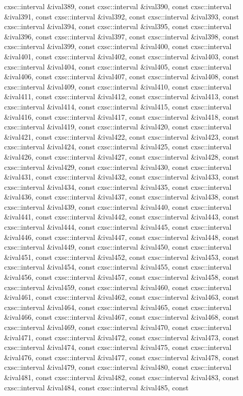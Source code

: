 \begin{DoxyCompactItemize}
cxsc\-::interval \&ival389, const cxsc\-::interval \&ival390, const cxsc\-::interval \&ival391, const cxsc\-::interval \&ival392, const cxsc\-::interval \&ival393, const cxsc\-::interval \&ival394, const cxsc\-::interval \&ival395, const cxsc\-::interval \&ival396, const cxsc\-::interval \&ival397, const cxsc\-::interval \&ival398, const cxsc\-::interval \&ival399, const cxsc\-::interval \&ival400, const cxsc\-::interval \&ival401, const cxsc\-::interval \&ival402, const cxsc\-::interval \&ival403, const cxsc\-::interval \&ival404, const cxsc\-::interval \&ival405, const cxsc\-::interval \&ival406, const cxsc\-::interval \&ival407, const cxsc\-::interval \&ival408, const cxsc\-::interval \&ival409, const cxsc\-::interval \&ival410, const cxsc\-::interval \&ival411, const cxsc\-::interval \&ival412, const cxsc\-::interval \&ival413, const cxsc\-::interval \&ival414, const cxsc\-::interval \&ival415, const cxsc\-::interval \&ival416, const cxsc\-::interval \&ival417, const cxsc\-::interval \&ival418, const cxsc\-::interval \&ival419, const cxsc\-::interval \&ival420, const cxsc\-::interval \&ival421, const cxsc\-::interval \&ival422, const cxsc\-::interval \&ival423, const cxsc\-::interval \&ival424, const cxsc\-::interval \&ival425, const cxsc\-::interval \&ival426, const cxsc\-::interval \&ival427, const cxsc\-::interval \&ival428, const cxsc\-::interval \&ival429, const cxsc\-::interval \&ival430, const cxsc\-::interval \&ival431, const cxsc\-::interval \&ival432, const cxsc\-::interval \&ival433, const cxsc\-::interval \&ival434, const cxsc\-::interval \&ival435, const cxsc\-::interval \&ival436, const cxsc\-::interval \&ival437, const cxsc\-::interval \&ival438, const cxsc\-::interval \&ival439, const cxsc\-::interval \&ival440, const cxsc\-::interval \&ival441, const cxsc\-::interval \&ival442, const cxsc\-::interval \&ival443, const cxsc\-::interval \&ival444, const cxsc\-::interval \&ival445, const cxsc\-::interval \&ival446, const cxsc\-::interval \&ival447, const cxsc\-::interval \&ival448, const cxsc\-::interval \&ival449, const cxsc\-::interval \&ival450, const cxsc\-::interval \&ival451, const cxsc\-::interval \&ival452, const cxsc\-::interval \&ival453, const cxsc\-::interval \&ival454, const cxsc\-::interval \&ival455, const cxsc\-::interval \&ival456, const cxsc\-::interval \&ival457, const cxsc\-::interval \&ival458, const cxsc\-::interval \&ival459, const cxsc\-::interval \&ival460, const cxsc\-::interval \&ival461, const cxsc\-::interval \&ival462, const cxsc\-::interval \&ival463, const cxsc\-::interval \&ival464, const cxsc\-::interval \&ival465, const cxsc\-::interval \&ival466, const cxsc\-::interval \&ival467, const cxsc\-::interval \&ival468, const cxsc\-::interval \&ival469, const cxsc\-::interval \&ival470, const cxsc\-::interval \&ival471, const cxsc\-::interval \&ival472, const cxsc\-::interval \&ival473, const cxsc\-::interval \&ival474, const cxsc\-::interval \&ival475, const cxsc\-::interval \&ival476, const cxsc\-::interval \&ival477, const cxsc\-::interval \&ival478, const cxsc\-::interval \&ival479, const cxsc\-::interval \&ival480, const cxsc\-::interval \&ival481, const cxsc\-::interval \&ival482, const cxsc\-::interval \&ival483, const cxsc\-::interval \&ival484, const cxsc\-::interval \&ival485, const 
\end{DoxyCompactItemize}
